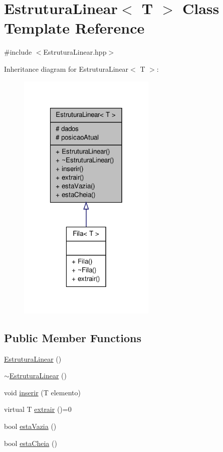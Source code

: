 \hypertarget{classEstruturaLinear}{\section{\-Estrutura\-Linear$<$ \-T $>$ \-Class \-Template \-Reference}
\label{classEstruturaLinear}
}


{\ttfamily \#include $<$\-Estrutura\-Linear.\-hpp$>$}



\-Inheritance diagram for \-Estrutura\-Linear$<$ \-T $>$\-:\nopagebreak
\begin{figure}[H]
\begin{center}
\leavevmode
\includegraphics[width=186pt]{classEstruturaLinear__inherit__graph}
\end{center}
\end{figure}
\subsection*{\-Public \-Member \-Functions}
\begin{DoxyCompactItemize}
\item 
\hyperlink{classEstruturaLinear_a496582da716a12f8ccd1eba17fb4f4d7}{\-Estrutura\-Linear} ()
\item 
\hyperlink{classEstruturaLinear_ac021e29886aad1d4df5160e5f024a5e2}{$\sim$\-Estrutura\-Linear} ()
\item 
void \hyperlink{classEstruturaLinear_a2dca70417efa321f537ede48e5260d8a}{inserir} (\-T elemento)
\item 
virtual \-T \hyperlink{classEstruturaLinear_a17729d661669c434e41e824040543679}{extrair} ()=0
\item 
bool \hyperlink{classEstruturaLinear_a0e51273ebf91279d54c7f22f1bb14c0f}{esta\-Vazia} ()
\item 
bool \hyperlink{classEstruturaLinear_a5b78e295fb033ac8b249004c630f1221}{esta\-Cheia} ()
\end{DoxyCompactItemize}
